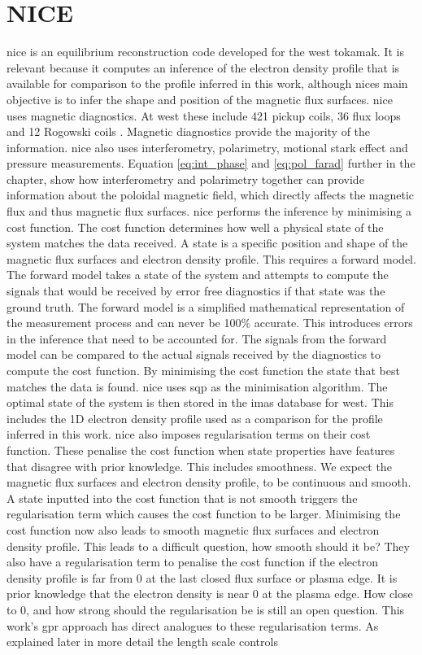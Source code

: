 \section{NICE}

\gls{nice} is an equilibrium reconstruction code developed for the \gls{west} tokamak. It is relevant because it computes an inference of the electron density profile that is available for comparison to the profile inferred in this work, although \glspl{nice} main objective is to infer the shape and position of the magnetic flux surfaces. \gls{nice} uses magnetic diagnostics. At \gls{west} these include 421 pickup coils, 36 flux loops and 12 Rogowski coils \cite{westmagdiag}. Magnetic diagnostics provide the majority of the information. \gls{nice} also uses interferometry, polarimetry, motional stark effect and pressure measurements. Equation \ref{eq:int_phase} and \ref{eq:pol_farad} further in the chapter, show how interferometry and polarimetry together can provide information about the poloidal magnetic field, which directly affects the magnetic flux and thus magnetic flux surfaces. \gls{nice} performs the inference by minimising a cost function. The cost function determines how well a physical state of the system matches the data received. A state is a specific position and shape of the magnetic flux surfaces and electron density profile. This requires a forward model. The forward model takes a state of the system and attempts to compute the signals that would be received by error free diagnostics if that state was the ground truth. The forward model is a simplified mathematical representation of the measurement process and can never be 100\% accurate. This introduces errors in the inference that need to be accounted for. The signals from the forward model can be compared to the actual signals received by the diagnostics to compute the cost function. By minimising the cost function the state that best matches the data is found. \gls{nice} uses \gls{sqp} as the minimisation algorithm. The optimal state of the system is then stored in the \gls{imas} database for \gls{west}. This includes the 1D electron density profile used as a comparison for the profile inferred in this work. \gls{nice} also imposes regularisation terms on their cost function. These penalise the cost function when state properties have features that disagree with prior knowledge. This includes smoothness. We expect the magnetic flux surfaces and electron density profile, to be continuous and smooth. A state inputted into the cost function that is not smooth triggers the regularisation term which causes the cost function to be larger. Minimising the cost function now also leads to smooth magnetic flux surfaces and electron density profile. This leads to a difficult question, how smooth should it be? They also have a regularisation term to penalise the cost function if the electron density profile is far from 0 at the last closed flux surface or plasma edge. It is prior knowledge that the electron density is near 0 at the plasma edge. How close to 0, and how strong should the regularisation be is still an open question. This work's \gls{gpr} approach has direct analogues to these regularisation terms. As explained later in more detail the length scale controls 